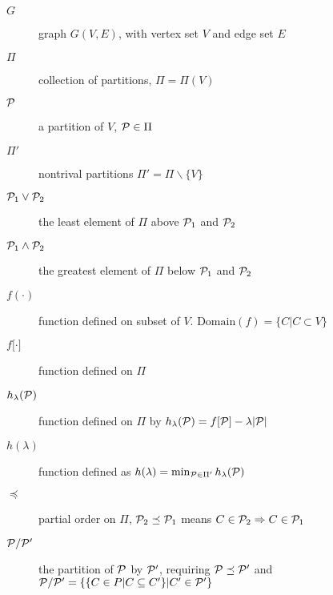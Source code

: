 \begin{description}
\item[$G$] graph $G(V,E)$, with vertex set $V$ and edge set $E$
\item[$\Pi$] collection of partitions, $\Pi = \Pi(V)$
\item[$\P$] a partition of $V$, $\P \in \Pi$
\item[$\Pi'$] nontrival partitions $\Pi' = \Pi \backslash \{V\}$
\item[$\P_1 \vee \P_2$] the least element of $\Pi$ above $\P_1$ and $\P_2$
\item[$\P_1 \wedge \P_2$] the greatest element of $\Pi$ below $\P_1$ and $\P_2$
\item[$f(\cdot)$] function defined on subset of $V$. $\mathrm{Domain}(f)=\{C| C\subset V\}$
\item[$f{[}\cdot{]}$] function defined on $\Pi$
\item[$h_{\lambda}(\P)$] function defined on $\Pi$ by $h_{\lambda}(\P)=f[\P]-\lambda\abs{\P}$
\item[$h(\lambda)$] function defined as $ h(\lambda) = \min_{\P \in \Pi'} h_{\lambda}(\P)$
\item[$\preceq$] partial order on $\Pi$, $\P_2 \preceq \P_1$ means $C\in \P_2 \Rightarrow C \in \P_1$
\item[$\P/\P'$] the partition of $\P$ by $\P'$, requiring $\P\preceq \P'$ and $\P/\P'=\{\{ C \in P | C \subseteq C' \} | C' \in \P'\}$
\end{description}

